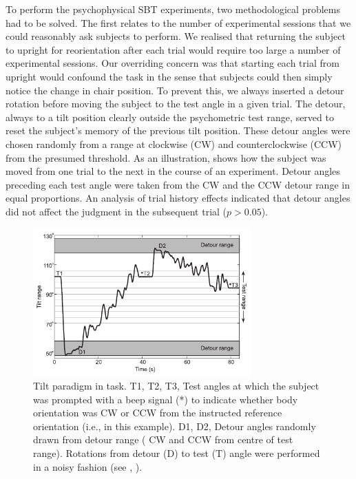 To perform the psychophysical SBT experiments, two methodological problems had to be solved. The first relates to the number of experimental sessions that we could reasonably ask subjects to perform. We realised that returning the subject to upright for reorientation after each trial would require too large a number of experimental sessions. Our overriding concern was that starting each trial from upright would confound the  task in the sense that subjects could then simply notice the change in chair position. To prevent this, we always inserted a detour rotation before moving the subject to the test angle in a given trial. The detour, always to a tilt position clearly outside the psychometric test range, served to reset the subject's memory of the previous tilt position. These detour angles were chosen randomly from a range at  clockwise (CW) and counterclockwise (CCW) from the presumed threshold. As an illustration,  shows how the subject was moved from one trial to the next in the course of an  experiment. Detour angles preceding each test angle were taken from the CW and the CCW detour range in equal proportions. An analysis of trial history effects indicated that detour angles did not affect the judgment in the subsequent trial ($p > 0.05$). 

\begin{figure}
    \includegraphics[width=0.75\textwidth]{src/paper1/figure2.pdf}
    
    \caption{Tilt paradigm in  task. T1, T2, T3, Test angles at which the subject was prompted with a beep signal (*) to indicate whether body orientation was CW or CCW from the instructed reference orientation (i.e.,  in this example). D1, D2, Detour angles randomly drawn from detour range ( CW and CCW from centre of test range). Rotations from detour (D) to test (T) angle were performed in a noisy fashion (see , ).}
    \label{p1:fig2}
\end{figure}

